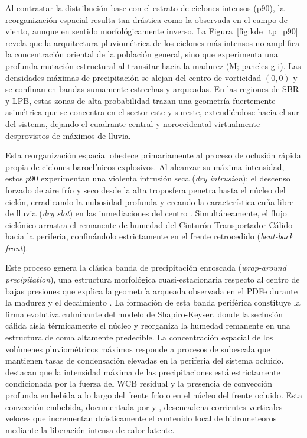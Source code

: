 Al contrastar la distribución base con el estrato de ciclones intensos (p90), la reorganización espacial resulta tan drástica como la observada en el campo de viento, aunque en sentido morfológicamente inverso. 
La Figura~\ref{fig:kde_tp_p90} revela que la arquitectura pluviométrica de los ciclones más intensos no amplifica la concentración oriental de la población general, sino que experimenta una profunda mutación estructural al transitar hacia la madurez (M; paneles g-i). 
Las densidades máximas de precipitación se alejan del centro de vorticidad $(0,0)$ y se confinan en bandas sumamente estrechas y arqueadas. 
En las regiones de SBR y LPB, estas zonas de alta probabilidad trazan una geometría fuertemente asimétrica que se concentra en el sector este y sureste, extendiéndose hacia el sur del sistema, dejando el cuadrante central y noroccidental virtualmente desprovistos de máximos de lluvia.

Esta reorganización espacial obedece primariamente al proceso de oclusión rápida propia de ciclones baroclínicos explosivos. 
Al alcanzar su máxima intensidad, estos $p90$ experimentan una violenta intrusión seca (\textit{dry intrusion}): el descenso forzado de aire frío y seco desde la alta troposfera penetra hasta el núcleo del ciclón, erradicando la nubosidad profunda y creando la característica cuña libre de lluvia (\textit{dry slot}) en las inmediaciones del centro \citep{shapiro1999bridge}. 
Simultáneamente, el flujo ciclónico arrastra el remanente de humedad del Cinturón Transportador Cálido hacia la periferia, confinándolo estrictamente en el frente retrocedido (\textit{bent-back front}). 

Este proceso genera la clásica banda de precipitación enroscada (\textit{wrap-around precipitation}), una estructura morfológica cuasi-estacionaria respecto al centro de bajas presiones que explica la geometría arqueada observada en el PDFe durante la madurez y el decaimiento \citep{schultz2021antecedents}. 
La formación de esta banda periférica constituye la firma evolutiva culminante del modelo de Shapiro-Keyser, donde la seclusión cálida aísla térmicamente el núcleo y reorganiza la humedad remanente en una estructura de coma altamente predecible.
La concentración espacial de los volúmenes pluviométricos máximos responde a procesos de subescala que mantienen tasas de condensación elevadas en la periferia del sistema ocluido. \citet{priestley2022improved} destacan que la intensidad máxima de las precipitaciones está estrictamente condicionada por la fuerza del WCB residual y la presencia de convección profunda embebida a lo largo del frente frío o en el núcleo del frente ocluido. 
Esta convección embebida, documentada por \citet{oertel2021warm} y \citet{blanchard2021warm}, desencadena corrientes verticales veloces que incrementan drásticamente el contenido local de hidrometeoros mediante la liberación intensa de calor latente. 

